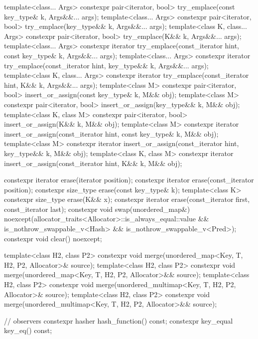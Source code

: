 \begin{codeblock}
{{    template<class... Args>
      constexpr pair<iterator, bool> try_emplace(const key_type& k, Args&&... args);
    template<class... Args>
      constexpr pair<iterator, bool> try_emplace(key_type&& k, Args&&... args);
    template<class K, class... Args>
      constexpr pair<iterator, bool> try_emplace(K&& k, Args&&... args);
    template<class... Args>
      constexpr iterator try_emplace(const_iterator hint, const key_type& k, Args&&... args);
    template<class... Args>
      constexpr iterator try_emplace(const_iterator hint, key_type&& k, Args&&... args);
    template<class K, class... Args>
      constexpr iterator try_emplace(const_iterator hint, K&& k, Args&&... args);
    template<class M>
      constexpr pair<iterator, bool> insert_or_assign(const key_type& k, M&& obj);
    template<class M>
      constexpr pair<iterator, bool> insert_or_assign(key_type&& k, M&& obj);
    template<class K, class M>
      constexpr pair<iterator, bool> insert_or_assign(K&& k, M&& obj);
    template<class M>
      constexpr iterator insert_or_assign(const_iterator hint, const key_type& k, M&& obj);
    template<class M>
      constexpr iterator insert_or_assign(const_iterator hint, key_type&& k, M&& obj);
    template<class K, class M>
      constexpr iterator insert_or_assign(const_iterator hint, K&& k, M&& obj);

    constexpr iterator  erase(iterator position);
    constexpr iterator  erase(const_iterator position);
    constexpr size_type erase(const key_type& k);
    template<class K> constexpr size_type erase(K&& x);
    constexpr iterator  erase(const_iterator first, const_iterator last);
    constexpr void      swap(unordered_map&)
      noexcept(allocator_traits<Allocator>::is_always_equal::value &&
               is_nothrow_swappable_v<Hash> && is_nothrow_swappable_v<Pred>);
    constexpr void      clear() noexcept;

    template<class H2, class P2>
      constexpr void merge(unordered_map<Key, T, H2, P2, Allocator>& source);
    template<class H2, class P2>
      constexpr void merge(unordered_map<Key, T, H2, P2, Allocator>&& source);
    template<class H2, class P2>
      constexpr void merge(unordered_multimap<Key, T, H2, P2, Allocator>& source);
    template<class H2, class P2>
      constexpr void merge(unordered_multimap<Key, T, H2, P2, Allocator>&& source);

    // observers
    constexpr hasher hash_function() const;
    constexpr key_equal key_eq() const;

}}
\end{codeblock}
